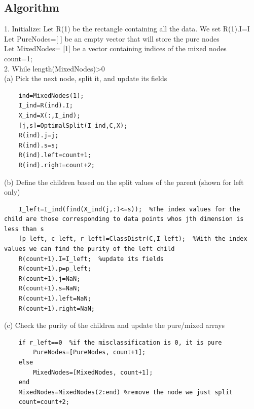\documentclass{article}
\begin{document}
\subsection*{Algorithm}
1.  Initialize: Let R(1) be the rectangle containing all the data.  We set R(1).I=I
    \\Let PureNodes=[ ] be an empty vector that will store the pure nodes
    \\Let MixedNodes= [1] be a vector containing indices of the mixed nodes
    \\count=1;
\\2.  While length(MixedNodes)>0 %
    \\(a) Pick the next node, split it, and update its fields
    \begin{verbatim}
    ind=MixedNodes(1);
    I_ind=R(ind).I;
    X_ind=X(:,I_ind);
    [j,s]=OptimalSplit(I_ind,C,X);
    R(ind).j=j;
    R(ind).s=s;
    R(ind).left=count+1;
    R(ind).right=count+2;
    \end{verbatim}
    
    (b) Define the children based on the split values of the parent (shown for left only) 
    \begin{verbatim}
    I_left=I_ind(find(X_ind(j,:)<=s));  %The index values for the child are those corresponding to data points whos jth dimension is less than s
    [p_left, c_left, r_left]=ClassDistr(C,I_left);  %With the index values we can find the purity of the left child
    R(count+1).I=I_left;  %update its fields
    R(count+1).p=p_left;
    R(count+1).j=NaN;
    R(count+1).s=NaN;
    R(count+1).left=NaN;
    R(count+1).right=NaN; 
    \end{verbatim}
    
    (c) Check the purity of the children and update the pure/mixed arrays
    \begin{verbatim}
    if r_left==0  %if the misclassification is 0, it is pure
        PureNodes=[PureNodes, count+1];
    else
        MixedNodes=[MixedNodes, count+1];
    end   
    MixedNodes=MixedNodes(2:end) %remove the node we just split
    count=count+2;
    \end{verbatim}
    
\end{document}
